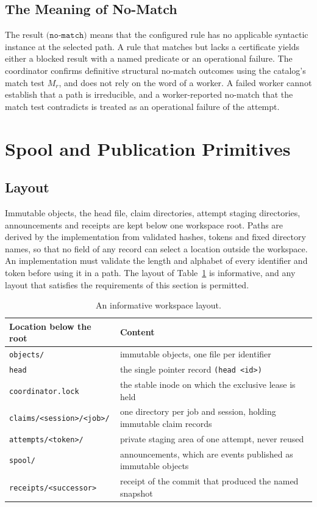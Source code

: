 \documentclass[11pt,a4paper]{article}
\theoremstyle{plain}
\theoremstyle{definition}
\theoremstyle{remark}
\theoremstyle{definition}
\newcommand{\code}[1]{\texttt{#1}}
\begin{document}
\subsection{The Meaning of No-Match}

The result $\code{(no-match)}$ means that the configured rule has no applicable syntactic instance at the selected path. A rule that matches but lacks a certificate yields either a blocked result with a named predicate or an operational failure. The coordinator confirms definitive structural no-match outcomes using the catalog's match test $M_r$, and does not rely on the word of a worker. A failed worker cannot establish that a path is irreducible, and a worker-reported no-match that the match test contradicts is treated as an operational failure of the attempt.

\section{Spool and Publication Primitives}
\label{sec:spool}

\subsection{Layout}

Immutable objects, the head file, claim directories, attempt staging directories, announcements and receipts are kept below one workspace root. Paths are derived by the implementation from validated hashes, tokens and fixed directory names, so that no field of any record can select a location outside the workspace. An implementation must validate the length and alphabet of every identifier and token before using it in a path. The layout of Table~\ref{tab:layout} is informative, and any layout that satisfies the requirements of this section is permitted.

\begin{table}[t]
\centering\small
\begin{tabular}{@{}p{4.8cm}p{8.4cm}@{}}
\toprule
Location below the root & Content \\
\midrule
\code{objects/} & immutable objects, one file per identifier \\
\code{head} & the single pointer record \code{(head <id>)} \\
\code{coordinator.lock} & the stable inode on which the exclusive lease is held \\
\code{claims/<session>/<job>/} & one directory per job and session, holding immutable claim records \\
\code{attempts/<token>/} & private staging area of one attempt, never reused \\
\code{spool/} & announcements, which are events published as immutable objects \\
\code{receipts/<successor>} & receipt of the commit that produced the named snapshot \\
\bottomrule
\end{tabular}
\caption{An informative workspace layout.}
\label{tab:layout}
\end{table}
\end{document}

